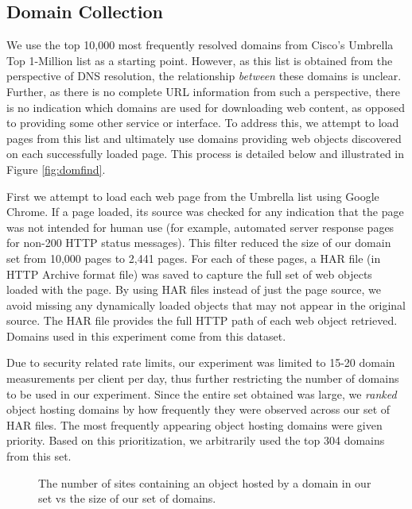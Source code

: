 \subsection{Domain Collection} \label{domcollect}

We use the top 10,000 most frequently resolved domains from Cisco's Umbrella Top
1-Million list \cite{scheitle2018} as a starting point. 
However, as this list is obtained from
the perspective of DNS resolution, the relationship \emph{between} these domains
is unclear. Further, as there is no complete URL information from such a
perspective, there is no indication which domains are used for downloading web
content, as opposed to providing some other service or interface. To address
this, we attempt to load pages from this list and ultimately use domains
providing web objects discovered on each successfully loaded page. This process
is detailed below and illustrated in Figure \ref{fig:domfind}.

First we attempt to load each web page from the Umbrella list using Google
Chrome. If a page loaded, its source was checked for any indication that the
page was not intended for human use (for example, automated server response
pages for non-200 HTTP status messages). This filter reduced the size of our
domain set from 10,000 pages to 2,441 pages. For each of these pages, a HAR file
(in HTTP Archive format file) was saved to capture the full set of web objects
loaded with the page. By using HAR files instead of just the page source, we
avoid missing any dynamically loaded objects that may not appear in the original
source. 
The HAR file provides the
full HTTP path of each web object retrieved. Domains used in this experiment
come from this dataset. 

Due to security related rate limits, our experiment was limited to 15-20 domain measurements per
client per day, thus further restricting the number of domains to be used in our
experiment. Since the entire set obtained was large, we \emph{ranked}
object hosting domains by how frequently they were observed across our set of HAR
files. The most frequently appearing object hosting domains were given priority.
Based on this prioritization, we arbitrarily used the top 304 domains from this set. 

\begin{figure}
    \caption{The number of sites containing an object hosted by a domain in our set vs
    the size of our set of domains.}
    \label{fig:sitescovered}
\end{figure}

